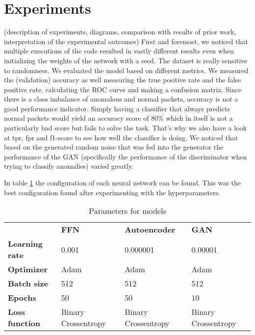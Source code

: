 \documentclass[]{article}
\begin{document}
	
	\section{Experiments}
	(description of experiments, diagrams, comparison with results of prior work, interpretation of the experimental outcomes)
	First and foremost, we noticed that multiple executions of the code resulted in vastly different results even when initializing the weights of the network with a seed. The dataset is really sensitive to randomness.  
	We evaluated the model based on different metrics. We measured the (validation) accuracy as well measuring the true positive rate and the false positive rate, calculating the ROC curve and making a confusion matrix. Since there is a class imbalance of anomalous and normal packets, accuracy is not a good performance indicator. Simply having a classifier that always predicts normal packets would yield an accuracy score of 80\% which in itself is not a particularly bad score but fails to solve the task. That's why we also have a look at tpr, fpr and f1-score to see how well the classifier is doing.  We noticed that based on the generated random noise that was fed into the generator the performance of the GAN (specifically the performance of the discriminator when trying to classify anomalies) varied greatly.
	\newline
	
	\noindent
	In table \ref{table1} the configuration of each neural network can be found. This was the best configuration found after experimenting with the hyperparameters. 
	
	\begin{table}[]
		\begin{tabular}{llll}
			& \textbf{FFN}        & \textbf{Autoencoder} & \textbf{GAN}        \\
			\textbf{Learning rate} & 0.001               & 0.000001             & 0.00001             \\
			\textbf{Optimizer}     & Adam                & Adam                 & Adam                \\
			\textbf{Batch size}    & 512                 & 512                  & 512                 \\
			\textbf{Epochs}        & 50                  & 50                   & 10                  \\
			\textbf{Loss function} & Binary Crossentropy & Binary Crossentropy  & Binary Crossentropy
		\end{tabular}
	\caption{Parameters for models}
	\label{table1}
	\end{table}
	
\end{document}
